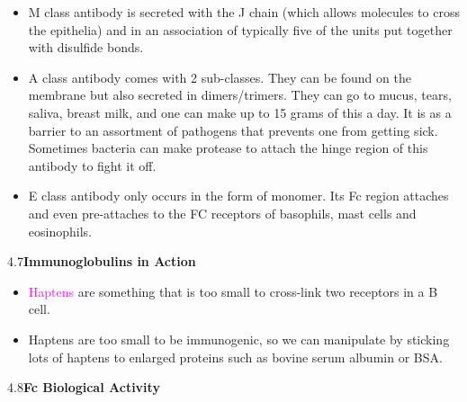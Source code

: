 \documentclass[UTF8]{book}
\newcommand{\pink}[1]{\textcolor{magenta}{#1}}
\begin{document}
\begin{itemize}
\begin{center}
\begin{tabular}{m{1cm}<{\centering}m{2cm}<{\centering}m{1.5cm}<{\centering}m{1.5cm}<{\centering}m{5cm}<{\centering}}
\end{tabular}
\end{center}
\item M class antibody is secreted with the J chain (which allows molecules to cross the epithelia) and in an association of typically five of the units put together with disulfide bonds.
\item A class antibody comes with 2 sub-classes. They can be found on the membrane but also secreted in dimers/trimers. They can go to mucus, tears, saliva, breast milk, and one can make up to 15 grams of this a day. It is as a barrier to an assortment of pathogens that prevents one from getting sick. Sometimes bacteria can make protease to attach the hinge region of this antibody to fight it off.
\item E class antibody only occurs in the form of monomer. Its Fc region attaches and even pre-attaches to the FC receptors of basophils, mast cells and eosinophils. 
\end{itemize}
4.7\quad \textbf{Immunoglobulins in Action}
\begin{itemize}
\item \pink{Haptens} are something that is too small to cross-link two receptors in a B cell.
\item Haptens are too small to be immunogenic, so we can manipulate by sticking lots of haptens to enlarged proteins such as bovine serum albumin or BSA.
\end{itemize}
4.8\quad \textbf{Fc Biological Activity}
\end{document}
